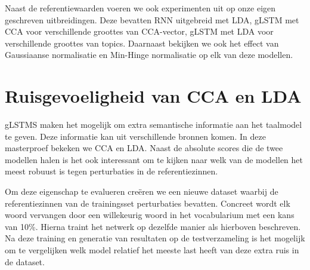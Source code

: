 Naast de referentiewaarden voeren we ook experimenten uit op onze eigen geschreven uitbreidingen.
Deze bevatten RNN uitgebreid met LDA, gLSTM met CCA voor verschillende groottes van CCA-vector, gLSTM met LDA voor verschillende groottes van topics. Daarnaast bekijken we ook het effect van Gaussiaanse normalisatie en Min-Hinge normalisatie op elk van deze modellen.

\section{Ruisgevoeligheid van CCA en LDA} %
\label{sec:ruisgevoeligheid_van_cca_en_lda}
gLSTMS maken het mogelijk om extra semantische informatie aan het taalmodel te geven. Deze informatie kan uit verschillende bronnen komen. In deze masterproef bekeken we CCA en LDA. Naast de absolute scores die de twee modellen halen is het ook interessant om te kijken naar welk van de modellen het meest robuust is tegen perturbaties in de referentiezinnen.

Om deze eigenschap te evalueren cre\"eren we een nieuwe dataset waarbij de referentiezinnen van de trainingsset perturbaties bevatten.
Concreet wordt elk woord vervangen door een willekeurig woord in het vocabularium met een kans van 10\%. Hierna traint het netwerk op dezelfde manier als hierboven beschreven. Na deze training en generatie van resultaten op de testverzameling is het mogelijk om te vergelijken welk model relatief het meeste last heeft van deze extra ruis in de dataset.


